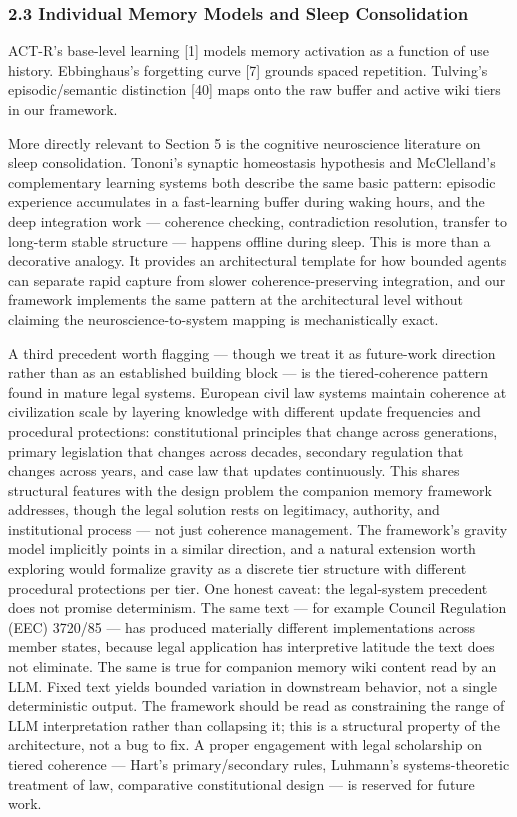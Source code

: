 \documentclass[
  11pt,
]{article}
\begin{document}
\hypertarget{individual-memory-models-and-sleep-consolidation}{%
\subsubsection{2.3 Individual Memory Models and Sleep
Consolidation}\label{individual-memory-models-and-sleep-consolidation}}

ACT-R's base-level learning {[}1{]} models memory activation as a
function of use history. Ebbinghaus's forgetting curve {[}7{]} grounds
spaced repetition. Tulving's episodic/semantic distinction {[}40{]} maps
onto the raw buffer and active wiki tiers in our framework.

More directly relevant to Section 5 is the cognitive neuroscience
literature on sleep consolidation. Tononi's synaptic homeostasis
hypothesis and McClelland's complementary learning systems both describe
the same basic pattern: episodic experience accumulates in a
fast-learning buffer during waking hours, and the deep integration work
--- coherence checking, contradiction resolution, transfer to long-term
stable structure --- happens offline during sleep. This is more than a
decorative analogy. It provides an architectural template for how
bounded agents can separate rapid capture from slower
coherence-preserving integration, and our framework implements the same
pattern at the architectural level without claiming the
neuroscience-to-system mapping is mechanistically exact.

A third precedent worth flagging --- though we treat it as future-work
direction rather than as an established building block --- is the
tiered-coherence pattern found in mature legal systems. European civil
law systems maintain coherence at civilization scale by layering
knowledge with different update frequencies and procedural protections:
constitutional principles that change across generations, primary
legislation that changes across decades, secondary regulation that
changes across years, and case law that updates continuously. This
shares structural features with the design problem the companion memory
framework addresses, though the legal solution rests on legitimacy,
authority, and institutional process --- not just coherence management.
The framework's gravity model implicitly points in a similar direction,
and a natural extension worth exploring would formalize gravity as a
discrete tier structure with different procedural protections per tier.
One honest caveat: the legal-system precedent does not promise
determinism. The same text --- for example Council Regulation (EEC)
3720/85 --- has produced materially different implementations across
member states, because legal application has interpretive latitude the
text does not eliminate. The same is true for companion memory wiki
content read by an LLM. Fixed text yields bounded variation in
downstream behavior, not a single deterministic output. The framework
should be read as constraining the range of LLM interpretation rather
than collapsing it; this is a structural property of the architecture,
not a bug to fix. A proper engagement with legal scholarship on tiered
coherence --- Hart's primary/secondary rules, Luhmann's
systems-theoretic treatment of law, comparative constitutional design
--- is reserved for future work.
\end{document}
